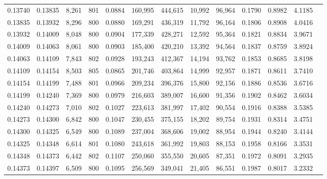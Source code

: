 \begin{tabular}{rrrrrrrrrrrrr}
0.13740 & 0.13835 &  8,261 & 801 &                                     0.0884 & 160,995 & 444,615 &  10,992 &  96,964 & 0.1790 & 0.8982 & 4.1185 \\
0.13835 & 0.13932 &  8,296 & 800 &                                     0.0880 & 169,291 & 436,319 &  11,792 &  96,164 & 0.1806 & 0.8908 & 4.0416 \\
0.13932 & 0.14009 &  8,048 & 800 &                                     0.0904 & 177,339 & 428,271 &  12,592 &  95,364 & 0.1821 & 0.8834 & 3.9671 \\
0.14009 & 0.14063 &  8,061 & 800 &                                     0.0903 & 185,400 & 420,210 &  13,392 &  94,564 & 0.1837 & 0.8759 & 3.8924 \\
0.14063 & 0.14109 &  7,843 & 802 &                                     0.0928 & 193,243 & 412,367 &  14,194 &  93,762 & 0.1853 & 0.8685 & 3.8198 \\
0.14109 & 0.14154 &  8,503 & 805 &                                     0.0865 & 201,746 & 403,864 &  14,999 &  92,957 & 0.1871 & 0.8611 & 3.7410 \\
0.14154 & 0.14199 &  7,488 & 801 &                                     0.0966 & 209,234 & 396,376 &  15,800 &  92,156 & 0.1886 & 0.8536 & 3.6716 \\
0.14199 & 0.14240 &  7,369 & 800 &                                     0.0979 & 216,603 & 389,007 &  16,600 &  91,356 & 0.1902 & 0.8462 & 3.6034 \\
0.14240 & 0.14273 &  7,010 & 802 &                                     0.1027 & 223,613 & 381,997 &  17,402 &  90,554 & 0.1916 & 0.8388 & 3.5385 \\
0.14273 & 0.14300 &  6,842 & 800 &                                     0.1047 & 230,455 & 375,155 &  18,202 &  89,754 & 0.1931 & 0.8314 & 3.4751 \\
0.14300 & 0.14325 &  6,549 & 800 &                                     0.1089 & 237,004 & 368,606 &  19,002 &  88,954 & 0.1944 & 0.8240 & 3.4144 \\
0.14325 & 0.14348 &  6,614 & 801 &                                     0.1080 & 243,618 & 361,992 &  19,803 &  88,153 & 0.1958 & 0.8166 & 3.3531 \\
0.14348 & 0.14373 &  6,442 & 802 &                                     0.1107 & 250,060 & 355,550 &  20,605 &  87,351 & 0.1972 & 0.8091 & 3.2935 \\
0.14373 & 0.14397 &  6,509 & 800 &                                     0.1095 & 256,569 & 349,041 &  21,405 &  86,551 & 0.1987 & 0.8017 & 3.2332 \\

\end{tabular}
